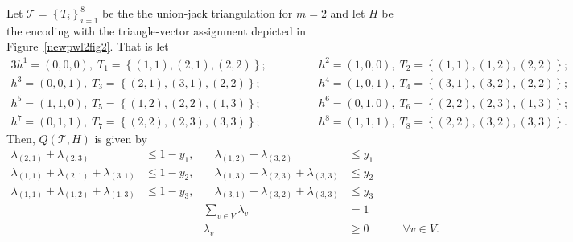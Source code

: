 \documentclass[mnsc]{informs3}
\newcommand{\set}[1]{\left\{#1\right\}}                     %
\newcommand{\bra}[1]{\left(#1\right)}
\begin{document}
\begin{example}\label{unionjackex}Let $\mathcal{T}=\set{T_i}_{i=1}^8$ be the the union-jack triangulation for $m=2$  and let $H$ be the encoding with the triangle-vector assignment depicted in Figure~\ref{newpwl2fig2}. That is let   
 \begin{alignat*}{3}
 h^1=(0,0,0),\; T_1=\set{\bra{1,1},\bra{2,1},\bra{2,2}};&\quad\quad\quad&h^2=(1,0,0),\; T_2=\set{\bra{1,1},\bra{1,2},\bra{2,2}};\\
 h^3=(0,0,1),\; T_3=\set{\bra{2,1},\bra{3,1},\bra{2,2}};&\quad\quad\quad&h^4=(1,0,1),\; T_4=\set{\bra{3,1},\bra{3,2},\bra{2,2}};\\ 
 h^5=(1,1,0),\; T_5=\set{\bra{1,2},\bra{2,2},\bra{1,3}};&\quad\quad\quad&h^6=(0,1,0),\; T_6=\set{\bra{2,2},\bra{2,3},\bra{1,3}};\\ 
 h^7=(0,1,1),\; T_7=\set{\bra{2,2},\bra{2,3},\bra{3,3}};&\quad\quad\quad&h^8=(1,1,1),\; T_8=\set{\bra{2,2},\bra{3,2},\bra{3,3}}.
  \end{alignat*}
  Then, $Q\bra{\mathcal{T},H}$ is given by
 \begin{subequations}\label{unionjackexform}
 \begin{alignat}{6}
   \lambda_{\bra{2,1}}+\lambda_{\bra{2,3}}&\leq 1-y_1,&\quad 
  \lambda_{\bra{1,2}}+\lambda_{\bra{3,2}}&\leq y_1&\quad& \\
    \lambda_{\bra{1,1}}+\lambda_{\bra{2,1}}+\lambda_{\bra{3,1}}& \leq 1-y_2, &\quad 
\lambda_{\bra{1,3}}+\lambda_{\bra{2,3}}+\lambda_{\bra{3,3}}& \leq y_2 &\quad&\\
  \lambda_{\bra{1,1}}+\lambda_{\bra{1,2}}+\lambda_{\bra{1,3}}& \leq 1-y_3, &\quad  
\lambda_{\bra{3,1}}+\lambda_{\bra{3,2}}+\lambda_{\bra{3,3}}& \leq y_3 &\quad&\\
 &&\sum\nolimits_{v\in V} \lambda_v &=1 \\
 &&\lambda_v &\geq 0 &&\forall v\in V.
 \end{alignat}
 \end{subequations}
\end{example}
\end{document}

